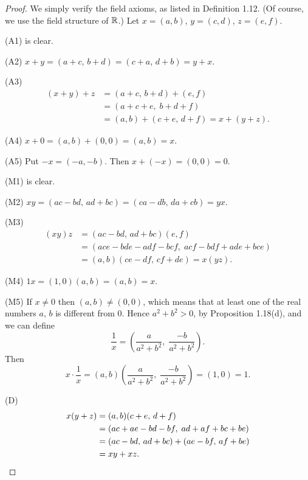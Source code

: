 \begin{proof}
We simply verify the field axioms, as listed in Definition 1.12. (Of course, we
use the field structure of $\mathbb{R}$.) Let $x = (a,b)$, $y = (c,d)$, $z = (e,f)$.

\smallskip
(A1) is clear.

(A2) $x+y = (a+c,\,b+d) = (c+a,\,d+b) = y+x$.

(A3) \begin{align*}
  (x+y)+z &= (a+c,\,b+d)+(e,f)\\
          &= (a+c+e,\; b+d+f)\\
          &= (a,b)+(c+e,\,d+f) = x+(y+z).
\end{align*}

(A4) $x + 0 = (a,b)+(0,0) = (a,b) = x$.

(A5) Put $-x = (-a,-b)$. Then $x + (-x) = (0,0) = 0$.

\smallskip
(M1) is clear.

(M2) $xy = (ac-bd,\,ad+bc) = (ca-db,\,da+cb) = yx$.

(M3) \begin{align*}
  (xy)z &= (ac-bd,\,ad+bc)(e,f)\\
        &= (ace-bde-adf-bcf,\; acf-bdf+ade+bce)\\
        &= (a,b)(ce-df,\,cf+de) = x(yz).
\end{align*}

(M4) $1x = (1,0)(a,b) = (a,b) = x$.

(M5) If $x \ne 0$ then $(a,b) \ne (0,0)$, which means that at least one of the
real numbers $a$, $b$ is different from $0$. Hence $a^2+b^2 > 0$, by Proposition
1.18(d), and
we can define
\[ \frac1x = \left(\frac{a}{a^2+b^2},\; \frac{-b}{a^2+b^2}\right). \]
Then
\[ x \cdot \frac1x = (a,b)\left(\frac{a}{a^2+b^2},\;
   \frac{-b}{a^2+b^2}\right) = (1,0) = 1. \]

\smallskip
(D) \begin{align*}
  x(y+z) &= (a,b)(c+e,\,d+f)\\
         &= (ac+ae-bd-bf,\; ad+af+bc+be)\\
         &= (ac-bd,\,ad+bc)+(ae-bf,\,af+be)\\
         &= xy + xz. \qedhere
\end{align*}
\end{proof}

